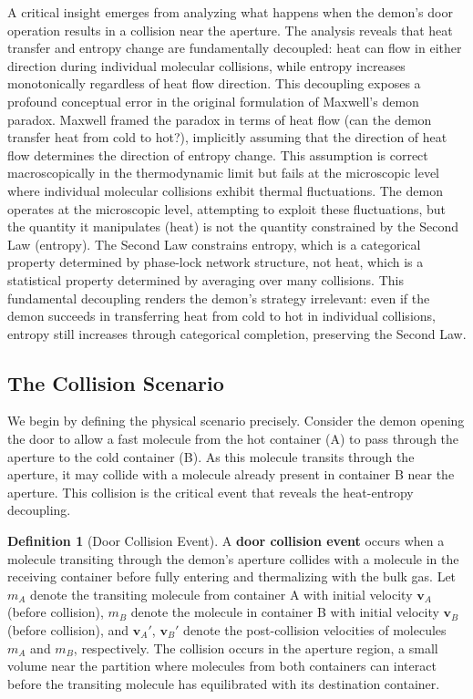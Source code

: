 \documentclass[12pt,a4paper]{article}
\theoremstyle{definition}
\newtheorem{definition}[theorem]{Definition}
\theoremstyle{remark}
\begin{document}
A critical insight emerges from analyzing what happens when the demon's door operation results in a collision near the aperture. The analysis reveals that heat transfer and entropy change are fundamentally decoupled: heat can flow in either direction during individual molecular collisions, while entropy increases monotonically regardless of heat flow direction. This decoupling exposes a profound conceptual error in the original formulation of Maxwell's demon paradox. Maxwell framed the paradox in terms of heat flow (can the demon transfer heat from cold to hot?), implicitly assuming that the direction of heat flow determines the direction of entropy change. This assumption is correct macroscopically in the thermodynamic limit but fails at the microscopic level where individual molecular collisions exhibit thermal fluctuations. The demon operates at the microscopic level, attempting to exploit these fluctuations, but the quantity it manipulates (heat) is not the quantity constrained by the Second Law (entropy). The Second Law constrains entropy, which is a categorical property determined by phase-lock network structure, not heat, which is a statistical property determined by averaging over many collisions. This fundamental decoupling renders the demon's strategy irrelevant: even if the demon succeeds in transferring heat from cold to hot in individual collisions, entropy still increases through categorical completion, preserving the Second Law.

\subsection{The Collision Scenario}

We begin by defining the physical scenario precisely. Consider the demon opening the door to allow a fast molecule from the hot container (A) to pass through the aperture to the cold container (B). As this molecule transits through the aperture, it may collide with a molecule already present in container B near the aperture. This collision is the critical event that reveals the heat-entropy decoupling.

\begin{definition}[Door Collision Event]
\label{def:door_collision}
A \textbf{door collision event} occurs when a molecule transiting through the demon's aperture collides with a molecule in the receiving container before fully entering and thermalizing with the bulk gas. Let $m_A$ denote the transiting molecule from container A with initial velocity $\mathbf{v}_A$ (before collision), $m_B$ denote the molecule in container B with initial velocity $\mathbf{v}_B$ (before collision), and $\mathbf{v}_A'$, $\mathbf{v}_B'$ denote the post-collision velocities of molecules $m_A$ and $m_B$, respectively. The collision occurs in the aperture region, a small volume near the partition where molecules from both containers can interact before the transiting molecule has equilibrated with its destination container.
\end{definition}
\end{document}

